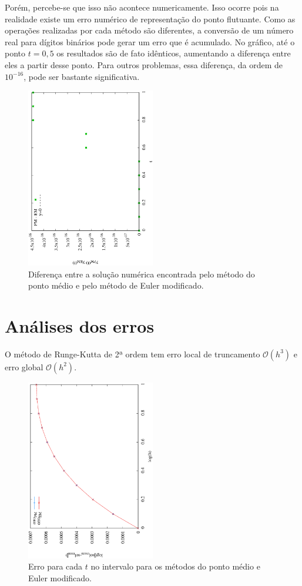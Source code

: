 \documentclass[brazilian, 12pt, a4paper, final]{article}
\begin{document}
Porém, percebe-se que isso não acontece numericamente. Isso ocorre pois na realidade existe um erro numérico de representação do ponto flutuante. Como as operações realizadas por cada método são diferentes, a conversão de um número real para dígitos binários pode gerar um erro que é acumulado. No gráfico, até o ponto $t=0,5$ os resultados são  de fato idênticos, aumentando a diferença entre eles a partir desse ponto. Para outros problemas, essa diferença, da ordem de $10^{-16}$, pode ser bastante significativa.

\begin{figure}[htbp]
  \centering
  \includegraphics[width=0.50\textwidth,angle=-90]{mid_eul.eps}
  \caption{Diferença entre a solução numérica encontrada pelo método do ponto médio e pelo método de Euler modificado.}
  \label{fig:mideul}
\end{figure}

\section{Análises dos erros}
O método de Runge-Kutta de 2ª ordem tem erro local de truncamento $\mathcal{O}(h^3)$ e erro global $\mathcal{O}(h^2)$.

\begin{figure}[htbp]
  \centering
  \includegraphics[width=0.50\textwidth,angle=-90]{erros.eps}
  \caption{Erro para cada $t$ no intervalo para os métodos do ponto médio e Euler modificado.}
  \label{fig:erro}
\end{figure}
\end{document}
